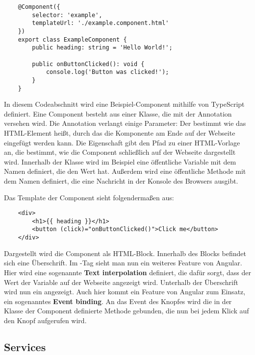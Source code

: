 \begin{verbatim}
    @Component({
        selector: 'example',
        templateUrl: './example.component.html'
    })
    export class ExampleComponent {
        public heading: string = 'Hello World!';
        
        public onButtonClicked(): void {
            console.log('Button was clicked!');
        }
    }
\end{verbatim}

In diesem Codeabschnitt wird eine Beispiel-Component mithilfe von TypeScript definiert. Eine Component besteht aus einer Klasse, die mit der  Annotation versehen wird. Die Annotation verlangt einige Parameter: Der  bestimmt wie das HTML-Element heißt, durch das die Komponente am Ende auf der Webseite eingefügt werden kann. Die Eigenschaft  gibt den Pfad zu einer HTML-Vorlage an, die bestimmt, wie die Component schließlich auf der Webseite dargestellt wird. Innerhalb der Klasse wird im Beispiel eine öffentliche Variable mit dem Namen  definiert, die den Wert  hat. Außerdem wird eine öffentliche Methode mit dem Namen  definiert, die eine Nachricht in der Konsole des Browsers ausgibt.

Das Template der Component sieht folgendermaßen aus:

\begin{verbatim}
    <div>
        <h1>{{ heading }}</h1>
        <button (click)="onButtonClicked()">Click me</button>
    </div>
\end{verbatim}

Dargestellt wird die Component als HTML-Block. Innerhalb des Blocks befindet sich eine Überschrift. Im -Tag sieht man nun ein weiteres Feature von Angular. Hier wird eine sogenannte \textbf{Text interpolation} definiert, die dafür sorgt, dass der Wert der Variable  auf der Webseite angezeigt wird. Unterhalb der Überschrift wird nun ein  angezeigt. Auch hier kommt ein Feature von Angular zum Einsatz, ein sogenanntes \textbf{Event binding}. An das  Event des Knopfes wird die in der Klasse der Component definierte Methode  gebunden, die nun bei jedem Klick auf den Knopf aufgerufen wird.

\subsection{Services}

